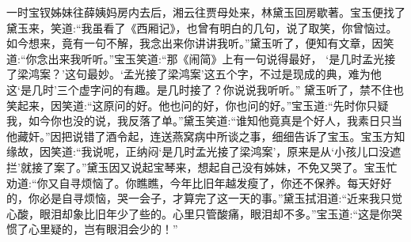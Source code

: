 \begin{parag}
    一时宝钗姊妹往薛姨妈房内去后，湘云往贾母处来，林黛玉回房歇著。宝玉便找了黛玉来，笑道:“我虽看了《西厢记》，也曾有明白的几句，说了取笑，你曾恼过。如今想来，竟有一句不解，我念出来你讲讲我听。”黛玉听了，便知有文章，因笑道:“你念出来我听听。”宝玉笑道:“那《闹简》上有一句说得最好， ‘是几时孟光接了梁鸿案？’这句最妙。‘孟光接了梁鸿案’这五个字，不过是现成的典，难为他这‘是几时’三个虚字问的有趣。是几时接了？你说说我听听。” 黛玉听了，禁不住也笑起来，因笑道:“这原问的好。他也问的好，你也问的好。”宝玉道:“先时你只疑我，如今你也没的说，我反落了单。”黛玉笑道:“谁知他竟真是个好人，我素日只当他藏奸。”因把说错了酒令起，连送燕窝病中所谈之事，细细告诉了宝玉。宝玉方知缘故，因笑道:“我说呢，正纳闷‘是几时孟光接了梁鸿案’，原来是从‘小孩儿口没遮拦’就接了案了。”黛玉因又说起宝琴来，想起自己没有姊妹，不免又哭了。宝玉忙劝道:“你又自寻烦恼了。你瞧瞧，今年比旧年越发瘦了，你还不保养。每天好好的，你必是自寻烦恼，哭一会子，才算完了这一天的事。”黛玉拭泪道:“近来我只觉心酸，眼泪却象比旧年少了些的。心里只管酸痛，眼泪却不多。”宝玉道:“这是你哭惯了心里疑的，岂有眼泪会少的！”
\end{parag}


